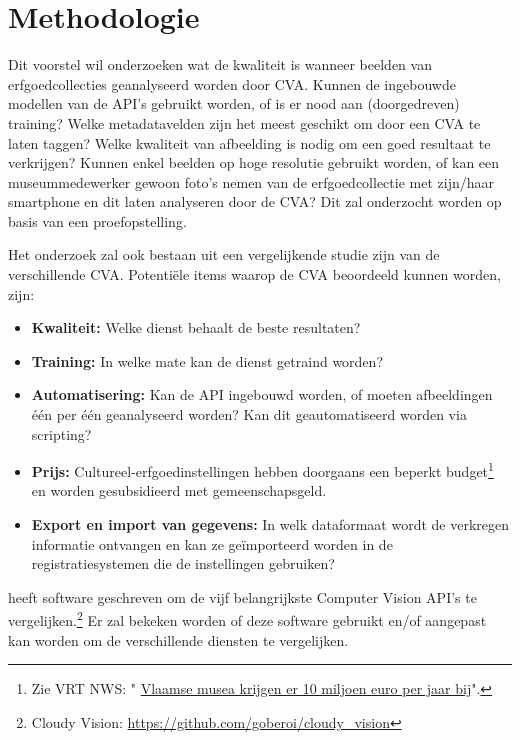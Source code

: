 \documentclass[fleqn,10pt]{voorstel}
\begin{document}
\section{Methodologie}
\label{sec:methodologie}

Dit voorstel wil onderzoeken wat de kwaliteit is wanneer beelden van erfgoedcollecties geanalyseerd worden door CVA. Kunnen de ingebouwde modellen van de API's gebruikt worden, of is er nood aan (doorgedreven) training? Welke metadatavelden zijn het meest geschikt om door een CVA te laten taggen? Welke kwaliteit van afbeelding is nodig om een goed resultaat te verkrijgen? Kunnen enkel beelden op hoge resolutie gebruikt worden, of kan een museummedewerker gewoon foto's nemen van de erfgoedcollectie met zijn/haar smartphone en dit laten analyseren door de CVA? Dit zal onderzocht worden op basis van een proefopstelling.

Het onderzoek zal ook bestaan uit een vergelijkende studie zijn van de verschillende CVA. Potenti\"ele items waarop de CVA beoordeeld kunnen worden, zijn:
\begin{itemize}
	\item \textbf{Kwaliteit:} Welke dienst behaalt de beste resultaten?
	\item \textbf{Training:} In welke mate kan de dienst getraind worden?
	\item \textbf{Automatisering:} Kan de API ingebouwd worden, of moeten afbeeldingen \'{e}\'{e}n per \'{e}\'{e}n geanalyseerd worden? Kan dit geautomatiseerd worden via scripting?
	\item \textbf{Prijs:} Cultureel-erfgoedinstellingen hebben doorgaans een beperkt budget\footnote{Zie VRT NWS: " \href{https://www.vrt.be/vrtnws/nl/2018/09/28/vlaamse-musea-krijgen-er-10-miljoen-euro-per-jaar-bij/}{Vlaamse musea krijgen er 10 miljoen euro per jaar bij}".} en worden gesubsidieerd met gemeenschapsgeld.
	\item \textbf{Export en import van gegevens:} In welk dataformaat wordt de verkregen informatie ontvangen en kan ze geïmporteerd worden in de registratiesystemen die de instellingen gebruiken?
\end{itemize}
\textcite{Oberoi2016} heeft software geschreven om de vijf belangrijkste Computer Vision API's te vergelijken.\footnote{Cloudy Vision: \url{https://github.com/goberoi/cloudy_vision}} Er zal bekeken worden of deze software gebruikt en/of aangepast kan worden om de verschillende diensten te vergelijken.
\end{document}
